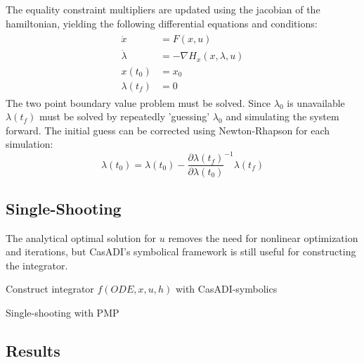 The equality constraint multipliers are updated using the jacobian of the hamiltonian, yielding the following differential equations and conditions:
\begin{align}
    \begin{split}
    \dot{x} &= F(x, u)\\
    \dot{\lambda} &= -\nabla H_x(x, \lambda, u)\\
    x(t_0) &= x_0\\
    \lambda(t_f) &= 0
    \end{split}
\end{align}
The two point boundary value problem must be solved. Since $\lambda_0$ is unavailable $\lambda(t_f)$ must be solved by repeatedly 'guessing' $\lambda_0$ and simulating the system forward. The initial guess can be corrected using Newton-Rhapson for each simulation:
\begin{equation}
    \lambda(t_0) = \lambda(t_0) - \frac{\partial \lambda(t_f)}{\partial \lambda(t_0)}^{-1} \lambda(t_f)
\end{equation}

\subsection{Single-Shooting}
The analytical optimal solution for $u$ removes the need for nonlinear optimization and iterations, but CasADI's symbolical framework is still useful for constructing the integrator. 

\begin{algorithm}[H]
\SetAlgoLined
{}
Construct integrator $f(ODE, x, u, h)$ with CasADI-symbolics\\
 \caption{Single-shooting with PMP}
 \label{alg:SingleShooting_Integration_PMP}
\end{algorithm}

\subsection{Results}
